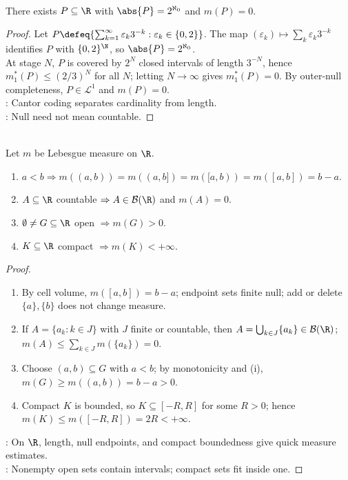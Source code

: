 \begin{corollary} \label{cor:uncountable-lebesgue-null-sets} \\
There exists $P\subseteq\R$ with $\abs{P}=2^{\aleph_0}$ and $m(P)=0$.
\begin{proof}
Let $P\defeq\{\sum_{k=1}^{\infty}\varepsilon_k3^{-k}:\varepsilon_k\in\{0,2\}\}$. The map $(\varepsilon_k)\mapsto\sum_k\varepsilon_k3^{-k}$ identifies $P$ with $\{0,2\}^{\N}$, so $\abs{P}=2^{\aleph_0}$.\\
At stage $N$, $P$ is covered by $2^N$ closed intervals of length $3^{-N}$, hence $m_1^\ast(P)\leq(2/3)^N$ for all $N$; letting $N\to\infty$ gives $m_1^\ast(P)=0$. By outer-null completeness, $P\in\mathcal{L}^1$ and $m(P)=0$.\\
: Cantor coding separates cardinality from length.\\
: Null need not mean countable.
\end{proof}
\end{corollary}

\begin{corollary} \label{cor:real-line-lebesgue-measure-checks} \\
Let $m$ be Lebesgue measure on $\R$.
\begin{enumerate}[label=(\roman*)]
\setlength{\itemsep}{0pt}
\item $a<b\Rightarrow m((a,b))=m((a,b])=m([a,b))=m([a,b])=b-a$.
\item $A\subseteq\R$ countable $\Rightarrow A\in\mathcal{B}(\R)$ and $m(A)=0$.
\item $\emptyset\neq G\subseteq\R$ open $\Rightarrow m(G)>0$.
\item $K\subseteq\R$ compact $\Rightarrow m(K)<+\infty$.
\end{enumerate}
\begin{proof}
\begin{enumerate}[label=(\roman*)]
\setlength{\itemsep}{0pt}
\item By cell volume, $m([a,b])=b-a$; endpoint sets finite null; add or delete $\{a\},\{b\}$ does not change measure.
\item If $A=\{a_k:k\in J\}$ with $J$ finite or countable, then $A=\bigcup_{k\in J}\{a_k\}\in\mathcal{B}(\R)$; $m(A)\leq\sum_{k\in J}m(\{a_k\})=0$.
\item Choose $(a,b)\subseteq G$ with $a<b$; by monotonicity and (i), $m(G)\geq m((a,b))=b-a>0$.
\item Compact $K$ is bounded, so $K\subseteq[-R,R]$ for some $R>0$; hence $m(K)\leq m([-R,R])=2R<+\infty$.
\end{enumerate}
: On $\R$, length, null endpoints, and compact boundedness give quick measure estimates.\\
: Nonempty open sets contain intervals; compact sets fit inside one.
\end{proof}
\end{corollary}

